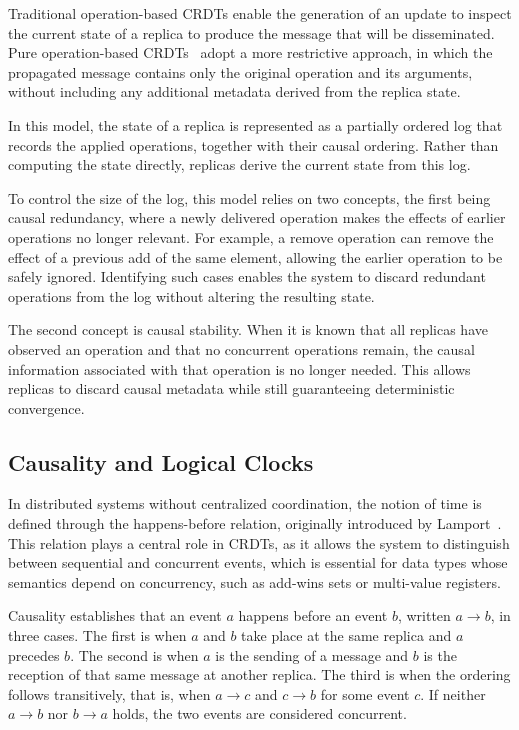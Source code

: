 Traditional operation-based CRDTs enable the generation of an update to inspect the current state of a replica to produce the message that will be disseminated. Pure operation-based CRDTs~\cite{baquero2017nested} adopt a more restrictive approach, in which the propagated message contains only the original operation and its arguments, without including any additional metadata derived from the replica state.

In this model, the state of a replica is represented as a partially ordered log that records the applied operations, together with their causal ordering. Rather than computing the state directly, replicas derive the current state from this log.

To control the size of the log, this model relies on two concepts, the first being causal redundancy, where a newly delivered operation makes the effects of earlier operations no longer relevant. For example, a remove operation can remove the effect of a previous add of the same element, allowing the earlier operation to be safely ignored. Identifying such cases enables the system to discard redundant operations from the log without altering the resulting state.

The second concept is causal stability. When it is known that all replicas have observed an operation and that no concurrent operations remain, the causal information associated with that operation is no longer needed. This allows replicas to discard causal metadata while still guaranteeing deterministic convergence.

\subsection{Causality and Logical Clocks}
\label{sub:logical_clocks}

In distributed systems without centralized coordination, the notion of time is defined through the happens-before relation, originally introduced by Lamport~\cite{lamport2019clocks}. This relation plays a central role in CRDTs, as it allows the system to distinguish between sequential and concurrent events, which is essential for data types whose semantics depend on concurrency, such as add-wins sets or multi-value registers.

Causality establishes that an event $a$ happens before an event $b$, written $a \rightarrow b$, in three cases. The first is when $a$ and $b$ take place at the same replica and $a$ precedes $b$. The second is when $a$ is the sending of a message and $b$ is the reception of that same message at another replica. The third is when the ordering follows transitively, that is, when $a \rightarrow c$ and $c \rightarrow b$ for some event $c$. If neither $a \rightarrow b$ nor $b \rightarrow a$ holds, the two events are considered concurrent.

